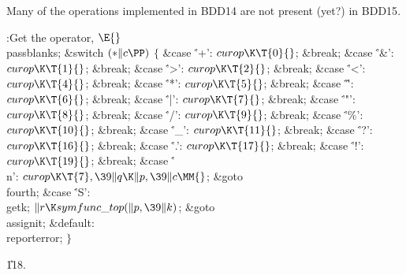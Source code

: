 Many of the operations implemented in {\mc BDD14} are not present
(yet?) in {\mc BDD15}.

\Y\B\4:Get the operator, \X${}\E{}$\6
\\{passblanks};\6
\&{switch} ${}({*}\|c\PP){}$\5
${}\{{}$\1\6
\4\&{case} \.{'+'}:\5
${}\\{curop}\K\T{0}{}$;\5
\&{break};\6
\4\&{case} \.{'\&'}:\5
${}\\{curop}\K\T{1}{}$;\5
\&{break};\6
\4\&{case} \.{'>'}:\5
${}\\{curop}\K\T{2}{}$;\5
\&{break};\6
\4\&{case} \.{'<'}:\5
${}\\{curop}\K\T{4}{}$;\5
\&{break};\6
\4\&{case} \.{'*'}:\5
${}\\{curop}\K\T{5}{}$;\5
\&{break};\6
\4\&{case} \.{'\^'}:\5
${}\\{curop}\K\T{6}{}$;\5
\&{break};\6
\4\&{case} \.{'|'}:\5
${}\\{curop}\K\T{7}{}$;\5
\&{break};\6
\4\&{case} \.{'"'}:\5
${}\\{curop}\K\T{8}{}$;\5
\&{break};\6
\4\&{case} \.{'/'}:\5
${}\\{curop}\K\T{9}{}$;\5
\&{break};\6
\4\&{case} \.{'\%'}:\5
${}\\{curop}\K\T{10}{}$;\5
\&{break};\6
\4\&{case} \.{'\_'}:\5
${}\\{curop}\K\T{11}{}$;\5
\&{break};\6
\4\&{case} \.{'?'}:\5
${}\\{curop}\K\T{16}{}$;\5
\&{break};\6
\4\&{case} \.{'.'}:\5
${}\\{curop}\K\T{17}{}$;\5
\&{break};\6
\4\&{case} \.{'!'}:\5
${}\\{curop}\K\T{19}{}$;\5
\&{break};\6
\4\&{case} \.{'\\n'}:\5
${}\\{curop}\K\T{7},\39\|q\K\|p,\39\|c\MM{}$;\5
\&{goto} \\{fourth};\6
\4\&{case} \.{'S'}:\5
\\{getk};\5
${}\|r\K\\{symfunc\_top}(\|p,\39\|k){}$;\5
\&{goto} \\{assignit};\6
\4\&{default}:\5
\\{reporterror};\6
\4${}\}{}$\2\par
\U118.\fi

